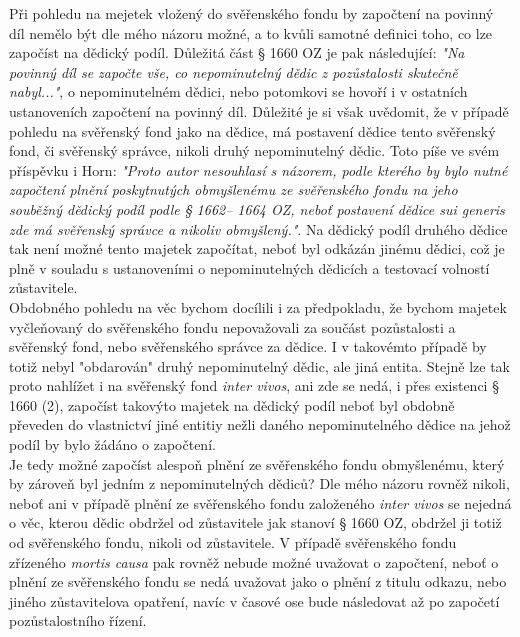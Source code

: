 \documentclass{article}
\begin{document}
Při pohledu na mejetek vložený do svěřenského fondu by započtení na povinný díl nemělo být dle mého názoru možné, a to kvůli samotné definici toho, co lze započíst na dědický podíl. Důležitá část § 1660 OZ je pak následující: \textit{"Na povinný díl se započte vše, co nepominutelný dědic z pozůstalosti skutečně nabyl..."}, o nepominutelném dědici, nebo potomkovi se hovoří i v ostatních ustanoveních započtení na povinný díl. Důležité je si však uvědomit, že v případě pohledu na svěřenský fond jako na dědice, má postavení dědice tento svěřenský fond, či svěřenský správce, nikoli druhý nepominutelný dědic. Toto píše ve svém příspěvku i Horn: \textit{"Proto autor nesouhlasí s názorem, podle kterého by bylo nutné započtení plnění poskytnutých obmyšlenému ze svěřenského fondu na jeho souběžný dědický podíl podle § 1662– 1664 OZ, neboť postavení dědice sui generis zde má svěřenský správce a nikoliv obmyšlený."}. Na dědický podíl druhého dědice tak není možné tento majetek započítat, neboť byl odkázán jinému dědici, což je plně v souladu s ustanoveními o nepominutelných dědicích a testovací volností zůstavitele.\\

Obdobného pohledu na věc bychom docílili i za předpokladu, že bychom majetek vyčleňovaný do svěřenského fondu nepovažovali za součást pozůstalosti a svěřenský fond, nebo svěřenského správce za dědice. I v takovémto případě by totiž nebyl "obdarován" druhý nepominutelný dědic, ale jiná entita. Stejně lze tak proto nahlížet i na svěřenský fond \textit{inter vivos}, ani zde se nedá, i přes existenci § 1660 (2), započíst takovýto majetek na dědický podíl neboť byl obdobně převeden do vlastnictví jiné entitiy nežli daného nepominutelného dědice na jehož podíl by bylo žádáno o započtení.\\

Je tedy možné započíst alespoň plnění ze svěřenského fondu obmyšlenému, který by zároveň byl jedním z nepominutelných dědiců? Dle mého názoru rovněž nikoli, neboť ani v případě plnění ze svěřenského fondu založeného \textit{inter vivos} se nejedná o věc, kterou dědic obdržel od zůstavitele jak stanoví § 1660 OZ, obdržel ji totiž od svěřenského fondu, nikoli od zůstavitele. V případě svěřenského fondu zřízeného \textit{mortis causa} pak rovněž nebude možné uvažovat o započtení, neboť o plnění ze svěřenského fondu se nedá uvažovat jako o plnění z titulu odkazu, nebo jiného zůstavitelova opatření, navíc v časové ose bude následovat až po započetí pozůstalostního řízení.\\
\end{document}
